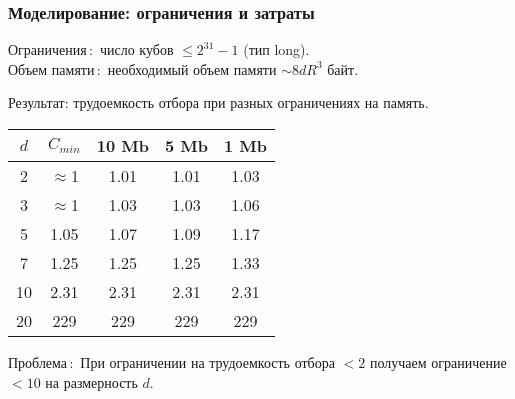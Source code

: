 \documentclass[pdf, intlimits, 14pt, unicode]{beamer} %
\begin{document}
\begin{frame}
    \frametitle{Моделирование: ограничения и затраты}
    \alert{Ограничения\,:}\, число кубов $\leq 2^{31}-1$ (тип long).\\
    \alert{Объем памяти\,:}\, необходимый объем памяти $\sim 8dR^3$
    байт.

    \alert{Результат:} трудоемкость отбора при разных ограничениях
    на память.

    \begin{center}
        \begin{tabular}{|c|c|c|c|c|}
            \hline
            $d$& $C_{min}$ & 10 Mb & 5 Mb &1 Mb\\ \hline
            2& $\approx$1& 1.01 & 1.01 & 1.03\\ \hline
            3& $\approx$1&1.03&1.03&1.06\\ \hline
            5& 1.05 & 1.07 & 1.09& 1.17 \\ \hline
            7&1.25&1.25&1.25&1.33\\\hline
            10& 2.31 & 2.31&2.31 &2.31\\ \hline
            20& 229&229&229&229\\\hline
        \end{tabular}
    \end{center}

    \alert{Проблема\,:}\, При ограничении на трудоемкость отбора
    $<2$ получаем ограничение $<10$ на
    размерность $d$.\\
\end{frame}
\end{document}
